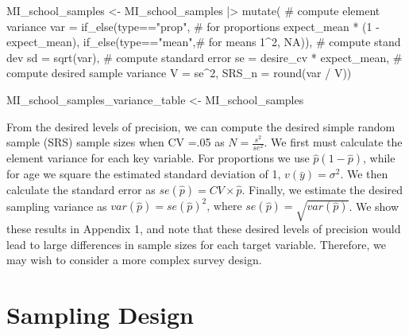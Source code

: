 \documentclass[
  12pt]{article}
\newenvironment{Shaded}{\begin{snugshade}}{\end{snugshade}}
\newcommand{\AttributeTok}[1]{\textcolor[rgb]{0.40,0.45,0.13}{#1}}
\newcommand{\CommentTok}[1]{\textcolor[rgb]{0.37,0.37,0.37}{#1}}
\newcommand{\ConstantTok}[1]{\textcolor[rgb]{0.56,0.35,0.01}{#1}}
\newcommand{\DecValTok}[1]{\textcolor[rgb]{0.68,0.00,0.00}{#1}}
\newcommand{\FunctionTok}[1]{\textcolor[rgb]{0.28,0.35,0.67}{#1}}
\newcommand{\NormalTok}[1]{\textcolor[rgb]{0.00,0.23,0.31}{#1}}
\newcommand{\OtherTok}[1]{\textcolor[rgb]{0.00,0.23,0.31}{#1}}
\newcommand{\SpecialCharTok}[1]{\textcolor[rgb]{0.37,0.37,0.37}{#1}}
\newcommand{\StringTok}[1]{\textcolor[rgb]{0.13,0.47,0.30}{#1}}
\begin{document}
\begin{Shaded}
\begin{Highlighting}[]
\NormalTok{MI\_school\_samples }\OtherTok{\textless{}{-}}\NormalTok{ MI\_school\_samples }\SpecialCharTok{|\textgreater{}} 
  \FunctionTok{mutate}\NormalTok{(}
    \CommentTok{\# compute element variance}
    \AttributeTok{var =} \FunctionTok{if\_else}\NormalTok{(type}\SpecialCharTok{==}\StringTok{"prop"}\NormalTok{, }\CommentTok{\# for proportions}
\NormalTok{                               expect\_mean }\SpecialCharTok{*}\NormalTok{ (}\DecValTok{1} \SpecialCharTok{{-}}\NormalTok{ expect\_mean), }
                               \FunctionTok{if\_else}\NormalTok{(type}\SpecialCharTok{==}\StringTok{"mean"}\NormalTok{,}\CommentTok{\# for means}
                                       \DecValTok{1}\SpecialCharTok{\^{}}\DecValTok{2}\NormalTok{, }\ConstantTok{NA}\NormalTok{)),}
    \CommentTok{\# compute stand dev}
    \AttributeTok{sd =} \FunctionTok{sqrt}\NormalTok{(var),}
    \CommentTok{\# compute standard error}
    \AttributeTok{se =}\NormalTok{ desire\_cv }\SpecialCharTok{*}\NormalTok{ expect\_mean,}
    \CommentTok{\# compute desired sample variance}
    \AttributeTok{V =}\NormalTok{ se}\SpecialCharTok{\^{}}\DecValTok{2}\NormalTok{,}
    \AttributeTok{SRS\_n =} \FunctionTok{round}\NormalTok{(var }\SpecialCharTok{/}\NormalTok{ V))}

\NormalTok{MI\_school\_samples\_variance\_table }\OtherTok{\textless{}{-}}\NormalTok{ MI\_school\_samples}
\end{Highlighting}
\end{Shaded}

From the desired levels of precision, we can compute the desired simple
random sample (SRS) sample sizes when CV =.05 as
\(N = \frac{s^2}{se^2}\). We first must calculate the element variance
for each key variable. For proportions we use \(\hat{p}(1-\hat{p})\),
while for age we square the estimated standard deviation of 1,
\(v(\bar{y}) = \sigma^2\). We then calculate the standard error as
\(se(\hat{p}) = CV \times \hat{p}\). Finally, we estimate the desired
sampling variance as
\(var(\hat{p}) =  se(\hat{p})^2 \text{, where }  se(\hat{p}) = \sqrt{var(\hat{p})}\).
We show these results in Appendix 1, and note that these desired levels
of precision would lead to large differences in sample sizes for each
target variable. Therefore, we may wish to consider a more complex
survey design.

\section{Sampling Design}\label{sec-meth}
\end{document}
